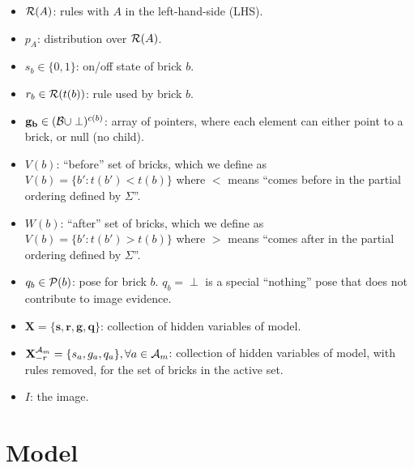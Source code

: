 \documentclass[11pt]{article}
\newcommand{\Pose}{{\cal P}}
\newcommand{\A}{{\cal A}}
\newcommand{\X}{\mathbf{X}}
\newcommand{\symb}{\Sigma}
\newcommand{\B}{\cal B}
\newcommand{\Xrm}{\X^{\Am}_{-r}}
\newcommand{\Am}{\A_{m}}
\begin{document}
\begin{itemize}
\item ${\cal R}(A)$: rules with $A$ in the left-hand-side (LHS).

\item $p_A$: distribution over ${\cal R}(A)$.

\item $s_b \in \{0,1\}$: on/off state of brick $b$.

\item $r_b \in {\cal R}(t(b))$: rule used by brick $b$.

\item $\mathbf{g_b} \in ( {\B} \cup \perp )^{c(b)}$: array of pointers, where each element can either point to a brick, or null (no child).

\item $V(b)$: ``before'' set of bricks, which we define as $V(b) = \{b' : t(b') < t(b) \}$ where $<$ means ``comes before in the partial ordering defined by $\symb$''.

\item $W(b)$: ``after'' set of bricks, which we define as $V(b) = \{b' : t(b') > t(b) \}$ where $>$ means ``comes after in the partial ordering defined by $\symb$''.

\item $q_b \in \Pose(b)$: pose for brick $b$. $q_b = \perp$ is a special ``nothing'' pose that does not contribute to image evidence.

\item $\X = \{ \mathbf{s}, \mathbf{r}, \mathbf{g}, \mathbf{q}\}$: collection of hidden variables of model.

\item $\Xrm = \{s_a, g_a, q_a\}, \forall a \in \Am$: collection of hidden variables of model, with rules removed, for the set of bricks in the active set.

\item $I$: the image.

\end{itemize}

\section{Model}
\end{document}
